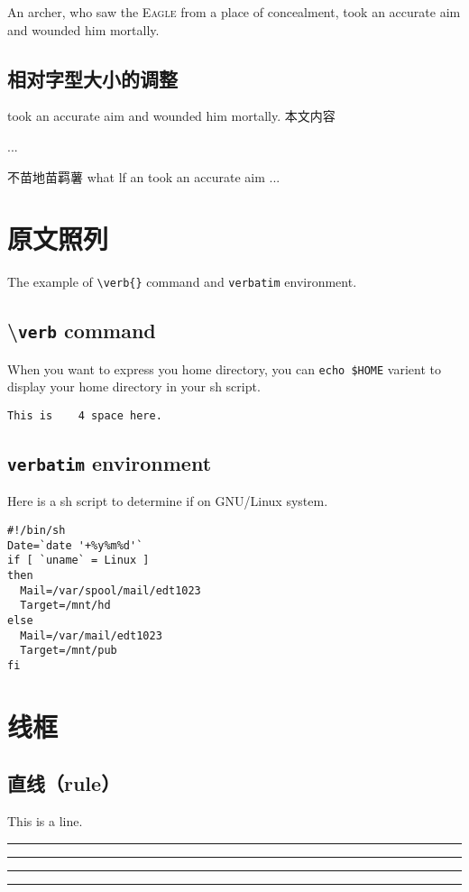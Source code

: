 \documentclass{report}
\begin{document}
An archer, who saw the \textsc{Eagle} from a place of concealment,
took an accurate aim and wounded him mortally.


\section{相对字型大小的调整}
\begin{small}
took an accurate aim and wounded him mortally.
  本文内容
\end{small}

  ...
\usepackage{type1cm}
不苗地苗羁薯  what lf an
took an accurate aim
  ...


\chapter{原文照列}
The example of \verb|\verb{}| command and \texttt{verbatim} environment.

\section{\textbackslash{}\texttt{verb} command}

When you want to express you home directory, you can \verb|echo $HOME|
varient to display your home directory in your sh script.

\noindent
\verb*|This is    4 space here.|

\section{\texttt{verbatim} environment}

Here is a sh script to determine if on GNU/Linux system.

\begin{verbatim}
#!/bin/sh
Date=`date '+%y%m%d'`
if [ `uname` = Linux ]
then
  Mail=/var/spool/mail/edt1023
  Target=/mnt/hd
else
  Mail=/var/mail/edt1023
  Target=/mnt/pub
fi
\end{verbatim}


\chapter{线框}

\section{直线（rule）}
\parskip=3pt
\parindent=0pt
This is a line.       %
\rule{3cm}{1pt}
\rule[1ex]{3cm}{1pt}
\rule[-1ex]{3cm}{1pt}
\rule[-1ex]{3cm}{1pt}
\end{document}
